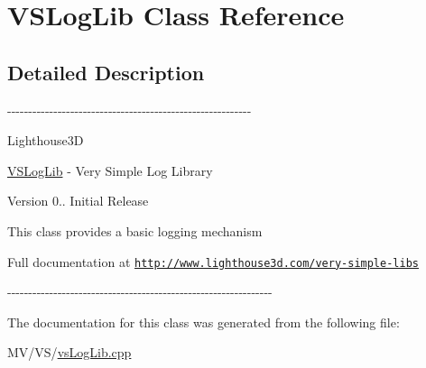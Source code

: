 \hypertarget{class_v_s_log_lib}{\section{\-V\-S\-Log\-Lib \-Class \-Reference}
\label{class_v_s_log_lib}
}


\subsection{\-Detailed \-Description}
-\/-\/-\/-\/-\/-\/-\/-\/-\/-\/-\/-\/-\/-\/-\/-\/-\/-\/-\/-\/-\/-\/-\/-\/-\/-\/-\/-\/-\/-\/-\/-\/-\/-\/-\/-\/-\/-\/-\/-\/-\/-\/-\/-\/-\/-\/-\/-\/-\/-\/-\/-\/-\/-\/-\/-\/-\/-\/

\-Lighthouse3\-D

\hyperlink{class_v_s_log_lib}{\-V\-S\-Log\-Lib} -\/ \-Very \-Simple \-Log \-Library

\begin{DoxyVersion}{\-Version}
0.. \-Initial \-Release
\end{DoxyVersion}
\-This class provides a basic logging mechanism

\-Full documentation at \href{http://www.lighthouse3d.com/very-simple-libs}{\tt http\-://www.\-lighthouse3d.\-com/very-\/simple-\/libs}

-\/-\/-\/-\/-\/-\/-\/-\/-\/-\/-\/-\/-\/-\/-\/-\/-\/-\/-\/-\/-\/-\/-\/-\/-\/-\/-\/-\/-\/-\/-\/-\/-\/-\/-\/-\/-\/-\/-\/-\/-\/-\/-\/-\/-\/-\/-\/-\/-\/-\/-\/-\/-\/-\/-\/-\/-\/-\/-\/-\/-\/-\/-\/ 

\-The documentation for this class was generated from the following file\-:\begin{DoxyCompactItemize}
\item 
\-M\-V/\-V\-S/\hyperlink{vs_log_lib_8cpp}{vs\-Log\-Lib.\-cpp}\end{DoxyCompactItemize}
